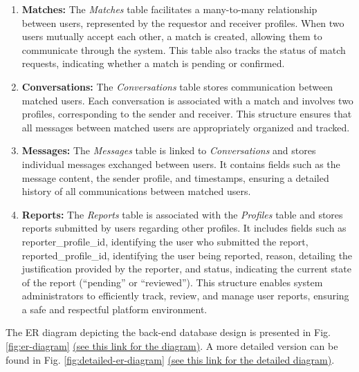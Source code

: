 \begin{enumerate}
            \item \textbf{Matches:} The \textit{Matches} table facilitates a many-to-many relationship between users, represented by the requestor and receiver profiles. When two users mutually accept each other, a match is created, allowing them to communicate through the system. This table also tracks the status of match requests, indicating whether a match is pending or confirmed.
        
            \item \textbf{Conversations:} The \textit{Conversations} table stores communication between matched users. Each conversation is associated with a match and involves two profiles, corresponding to the sender and receiver. This structure ensures that all messages between matched users are appropriately organized and tracked.
        
            \item \textbf{Messages:} The \textit{Messages} table is linked to \textit{Conversations} and stores individual messages exchanged between users. It contains fields such as the message content, the sender profile, and timestamps, ensuring a detailed history of all communications between matched users.

           \item \textbf{Reports:} The \textit{Reports} table is associated with the \textit{Profiles} table and stores reports submitted by users regarding other profiles. It includes fields such as reporter\_profile\_id, identifying the user who submitted the report, reported\_profile\_id, identifying the user being reported, reason, detailing the justification provided by the reporter, and status, indicating the current state of the report (“pending” or “reviewed”). This structure enables system administrators to efficiently track, review, and manage user reports, ensuring a safe and respectful platform environment.
        \end{enumerate}

        The ER diagram depicting the back-end database design is presented in Fig. \ref{fig:er-diagram} \href{https://drive.google.com/file/d/1lU1P8GRHPZu2EbJHOeeWxCCiQLVHy9oV/view?usp=sharing}{(see this link for the diagram)}. A more detailed version can be found in Fig. \ref{fig:detailed-er-diagram} \href{https://drive.google.com/file/d/1u3mAT54PdHx2mOwaZDrvpfvSL_J-zFSM/view?usp=drive_link}{(see this link for the detailed diagram)}.

